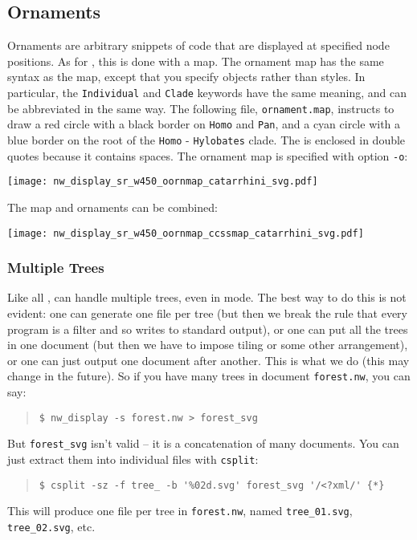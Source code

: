 \subsection{Ornaments}

Ornaments are arbitrary snippets of \svg{} code that are displayed at specified
node positions. As for \css, this is done with a map. The ornament map has the
same syntax as the \css{} map, except that you specify \svg{} objects rather
than \css{} styles. In particular, the \texttt{Individual} and \texttt{Clade}
keywords have the same meaning, and can be abbreviated in the same way. The
following file, \texttt{ornament.map}, instructs to draw a red circle with a
black border on \texttt{Homo} and \texttt{Pan}, and a cyan circle with a blue
border on the root of the \texttt{Homo} - \texttt{Hylobates} clade. The \svg{} is enclosed in double quotes because it contains spaces. The
ornament map is specified with option \texttt{-o}:
				
\begin{quote}
 
\end{quote}



\begin{center}
 \texttt{[image: nw\_display\_sr\_w450\_oornmap\_catarrhini\_svg.pdf]}
\end{center}

\noindent{}The \css{} map and ornaments can be combined:



\begin{center}
 \texttt{[image: nw\_display\_sr\_w450\_oornmap\_ccssmap\_catarrhini\_svg.pdf]}
\end{center}

\subsubsection{Multiple \svg{} Trees}

Like all \nutils, \display{} can handle multiple trees, even in \svg{} mode.
The best way to do this is not evident: one can generate one file per tree (but
then we break the rule that every program is a filter and so writes to standard
output), or one can put all the trees in one \svg{} document (but then we have
to impose tiling or some other arrangement), or one can just output one \svg{}
document after another. This is what we do (this may change in the future). So
if you have many trees in document \texttt{forest.nw}, you can say:
\begin{quote}
\verb+$ nw_display -s forest.nw > forest_svg+
\end{quote}
But \texttt{forest\_svg} isn't valid \svg{} -- it is a concatenation of many \svg{} documents. You can just extract them into individual files with \texttt{csplit}:
\begin{quote}
\verb+$ csplit -sz -f tree_ -b '%02d.svg' forest_svg '/<?xml/' {*}+
\end{quote}
This will produce one \svg{} file per tree in \texttt{forest.nw}, named \texttt{tree\_01.svg}, \texttt{tree\_02.svg}, etc.

